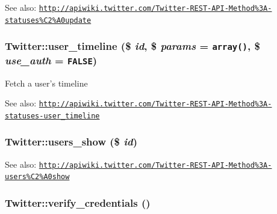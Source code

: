 \begin{Desc}
\item[See also:]\href{http://apiwiki.twitter.com/Twitter-REST-API-Method%3A-statuses%C2%A0update}{\tt http://apiwiki.twitter.com/Twitter-REST-API-Method\%3A-statuses\%C2\%A0update} \end{Desc}
\hypertarget{classTwitter_c551ee66261993a6722f1e056f0b3b1f}{
\subsubsection[{user\_\-timeline}]{\setlength{\rightskip}{0pt plus 5cm}Twitter::user\_\-timeline (\$ {\em id}, \/  \$ {\em params} = {\tt array()}, \/  \$ {\em use\_\-auth} = {\tt FALSE})}}
\label{classTwitter_c551ee66261993a6722f1e056f0b3b1f}


Fetch a user's timeline

\begin{Desc}
\item[See also:]\href{http://apiwiki.twitter.com/Twitter-REST-API-Method%3A-statuses-user_timeline}{\tt http://apiwiki.twitter.com/Twitter-REST-API-Method\%3A-statuses-user\_\-timeline} \end{Desc}
\hypertarget{classTwitter_b075baa3b9b5ac1dae324db84025d0af}{
\subsubsection[{users\_\-show}]{\setlength{\rightskip}{0pt plus 5cm}Twitter::users\_\-show (\$ {\em id})}}
\label{classTwitter_b075baa3b9b5ac1dae324db84025d0af}


\begin{Desc}
\item[See also:]\href{http://apiwiki.twitter.com/Twitter-REST-API-Method%3A-users%C2%A0show}{\tt http://apiwiki.twitter.com/Twitter-REST-API-Method\%3A-users\%C2\%A0show} \end{Desc}
\hypertarget{classTwitter_d66adb8eb0c9d1d6bd7b7b87045fd314}{
\subsubsection[{verify\_\-credentials}]{\setlength{\rightskip}{0pt plus 5cm}Twitter::verify\_\-credentials ()}}
\label{classTwitter_d66adb8eb0c9d1d6bd7b7b87045fd314}


